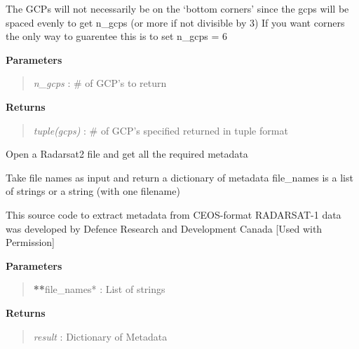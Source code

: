 \documentclass[letterpaper,10pt,openany,oneside]{sphinxmanual}
\begin{document}
\begin{fulllineitems}
\begin{fulllineitems}
The GCPs will not necessarily be on the `bottom corners' since the gcps
will be spaced evenly to get n\_gcps (or more if not divisible by 3)
If you want corners the only way to guarentee this is to set n\_gcps = 6

\textbf{Parameters}
\begin{quote}

\emph{n\_gcps}      : \# of GCP's to return
\end{quote}

\textbf{Returns}
\begin{quote}

\emph{tuple(gcps)} : \# of GCP's specified returned in tuple format
\end{quote}

\end{fulllineitems}


\begin{fulllineitems}
\label{code:Metadata.Metadata.getRS2metadata}
Open a Radarsat2 file and get all the required metadata

\end{fulllineitems}


\begin{fulllineitems}
\label{code:Metadata.Metadata.get_ceos_metadata}
Take file names as input and return a dictionary of metadata
file\_names is a list of strings or a string (with one filename)

This source code to extract metadata from CEOS-format RADARSAT-1 
data was developed by Defence Research and Development Canada
{[}Used with Permission{]}

\textbf{Parameters}
\begin{quote}

{\color{red}\bfseries{}**}file\_names* : List of strings
\end{quote}

\textbf{Returns}
\begin{quote}

\emph{result}     : Dictionary of Metadata
\end{quote}

\end{fulllineitems}


\end{fulllineitems}
\end{document}
